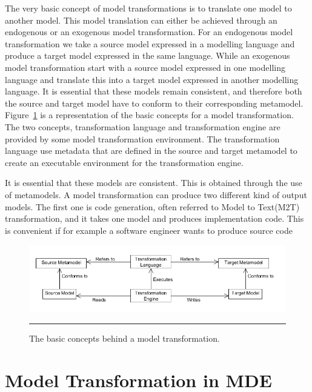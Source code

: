 The very basic concept of model transformations is to translate one model to
another model. This model translation can either be achieved through an
endogenous or an exogenous model transformation. For an endogenous model
transformation we take a source model expressed in a modelling language and
produce a target model expressed in the same language. While an exogenous model
transformation start with a source model expressed in one modelling language and
translate this into a target model expressed in another modelling language. It
is essential that these models remain consistent, and therefore both the source
and target model have to conform to their corresponding metamodel.
Figure~\ref{fig:BasicTransformation} is a representation of the basic concepts
for a model transformation. The two concepts, transformation language and
transformation engine are provided by some model transformation environment.
The transformation language use metadata that are defined in the source and
target metamodel to create an executable environment for the transformation
engine. 

It is essential that these models are consistent. This is
obtained through the use of metamodels.
A model transformation can produce two different kind of output models. The
first one is code generation, often referred to Model to Text(M2T)
transformation, and it takes one model and produces implementation code. This
is convenient if for example a software engineer wants to produce source code

\begin{figure}[H]
  \centering
    \includegraphics[scale=0.5]{./Figures/BasicTransformation.png}
    \rule{35em}{0.5pt}
  \caption[Basic Model Transformation]
  				{The basic concepts behind a model
  transformation.}
  \label{fig:BasicTransformation}
\end{figure}

\section{Model Transformation in MDE}


